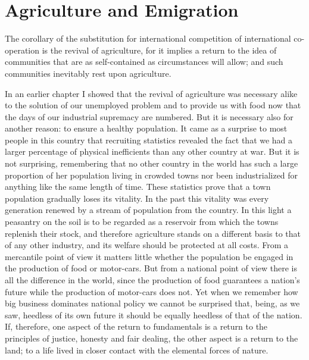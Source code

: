 \documentclass{book}
\begin{document}
\chapter{Agriculture and Emigration}
\label{chapter-9}
The corollary of the substitution for international competition of international co-operation is the revival of agriculture, for it implies a return to the idea of communities that are as self-contained as circumstances will allow; and such communities inevitably rest upon agriculture.

In an earlier chapter I showed that the revival of agriculture was necessary alike to the solution of our unemployed problem and to provide us with food now that the days of our industrial supremacy are numbered. But it is necessary also for another reason: to ensure a healthy population. It came as a surprise to most people in this country that recruiting statistics revealed the fact that we had a larger percentage of physical inefficients than any other country at war. But it is not surprising, remembering that no other country in the world has such a large proportion of her population living in crowded towns nor been industrialized for anything like the same length of time. These statistics prove that a town population gradually loses its vitality. In the past this vitality was every generation renewed by a stream of population from the country. In this light a peasantry on the soil is to be regarded as a reservoir from which the towns replenish their stock, and therefore agriculture stands on a different basis to that of any other industry, and its welfare should be protected at all costs. From a mercantile point of view it matters little whether the population be engaged in the production of food or motor-cars. But from a national point of view there is all the difference in the world, since the production of food guarantees a nation’s future while the production of motor-cars does not. Yet when we remember how big business dominates national policy we cannot be surprised that, being, as we saw, heedless of its own future it should be equally heedless of that of the nation. If, therefore, one aspect of the return to fundamentals is a return to the principles of justice, honesty and fair dealing, the other aspect is a return to the land; to a life lived in closer contact with the elemental forces of nature.
\end{document}
